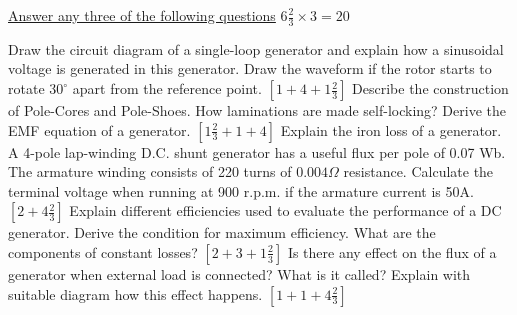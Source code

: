 \documentclass[a4paper,11pt]{exam}
\begin{document}
\underline{Answer any three of the following questions} \hfill $6\frac{2}{3} \times 3 = 20$
\begin{questions}
    \question Draw the circuit diagram of a single-loop generator and explain how a sinusoidal voltage is generated in this generator. Draw the waveform if the rotor starts to rotate $30^\circ$ apart from the reference point. \hfill $[1+4+1\frac{2}{3}]$
    \question Describe the construction of Pole-Cores and Pole-Shoes. How laminations are made self-locking? Derive the EMF equation of a generator. \hfill $[1\frac{2}{3}+1+4]$
    \question Explain the iron loss of a generator. \\ 
    A 4-pole lap-winding D.C. shunt generator has a useful flux per pole of 0.07 Wb. The armature winding consists of 220 turns of $0.004 \Omega$ resistance. Calculate the terminal voltage when running at 900 r.p.m. if the armature current is 50A. \hfill $[2+4\frac{2}{3}]$
    \question Explain different efficiencies used to evaluate the performance of a DC generator. Derive the condition for maximum efficiency. What are the components of constant losses? \hfill $[2+3+1\frac{2}{3}]$ 
    \question Is there any effect on the flux of a generator when external load is connected? What is it called? Explain with suitable diagram how this effect happens. \hfill $[1+1+4\frac{2}{3}]$
\end{questions}
\end{document}
